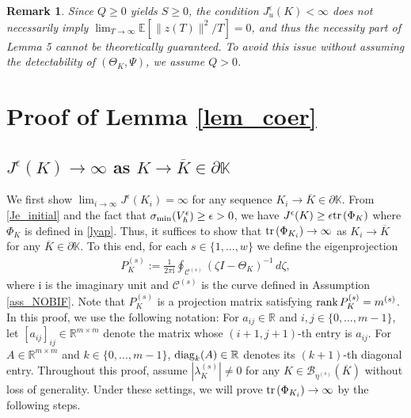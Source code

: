 \documentclass[preprint,5p,times,twocolumn]{elsarticle}
\newtheorem{rem}{Remark}
\def\rank{{\rm rank} \hspace{0.5mm}}
\def\tr{{\rm tr} \hspace{0.5mm}}
\begin{document}
\begin{rem}\label{rem_Qdefinite}
Since $Q \geq 0$ yields $S \geq 0$, the condition $J_u^{\epsilon}(K) < \infty$ does not necessarily imply $\lim_{T \rightarrow \infty} \mathbb{E}[\|z(T)\|^2/T] = 0$, and thus the necessity part of Lemma 5 cannot be theoretically guaranteed. To avoid this issue without assuming the detectability of $(\Theta_K, \Psi)$, we assume $Q > 0$. 
\end{rem}

\section{Proof of Lemma \ref{lem_coer}} \label{prf_lem_coer}
\subsection{$J^{\epsilon}(K) \to \infty$ as $K \to \overline{K}\in\partial\mathbb K$}
We first show $\lim_{i \to \infty} J^{\epsilon}(K_i) = \infty$ for any sequence $K_i\to\overline K\in\partial\mathbb K$. From \eqref{Je_initial} and the fact that $\sigma_{\rm min}(V_h^{\epsilon}) \geq \epsilon >0$, we have $J^{\epsilon}(K) \geq \epsilon \tr(\Phi_K)$ where $\Phi_K$ is defined in \eqref{lyap}. Thus, it suffices to show that $\tr(\Phi_{K_i}) \to \infty$ as $K_i \to \overline{K}$ for any $\overline{K} \in \partial \mathbb{K}$. To this end, for each $s \in \{1, \dots, w\}$ we define the eigenprojection
\begin{align}
    P^{(s)}_K := \frac{1}{2\pi {\mathrm i}}\oint_{\mathcal C^{(s)}} (\zeta I-\Theta_K)^{-1}\,d\zeta, 
\end{align}
where ${\mathrm i}$ is the imaginary unit and $\mathcal C^{(s)}$ is the curve defined in Assumption \ref{ass_NOBIF}. Note that $P^{(s)}_K$ is a projection matrix satisfying $\rank P^{(s)}_K = m^{(s)}$. In this proof, we use the following notation: 
For $a_{ij}\in\mathbb R$ and $i,j \in \{0,\dots,m-1\}$, let $[a_{ij}]_{ij} \in \mathbb R^{m \times m}$ denote the matrix whose $(i+1,j+1)$-th entry is $a_{ij}$. For $A \in \mathbb R^{m \times m}$ and $k \in \{0, \dots, m-1\}$, ${\rm diag}_k(A) \in \mathbb R$ denotes its $(k+1)$-th diagonal entry. Throughout this proof, assume $|\lambda_K^{(s)}|\not=0$ for any $K \in \mathcal B_{\eta^{(s)}}(\overline{K})$ without loss of generality. Under these settings, we will prove $\tr(\Phi_{K_i}) \to \infty$ by the following steps. %
\end{document}
